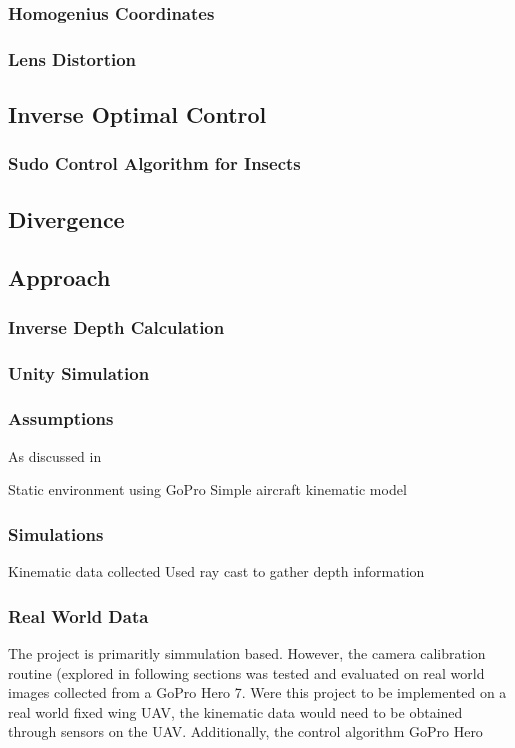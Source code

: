 \documentclass{UoNMCHA}
\numberwithin{equation}{section}
\begin{document}
\subsubsection{Homogenius Coordinates}

\subsubsection{Lens Distortion}

\subsection{Inverse Optimal Control} %
\subsubsection{Sudo Control Algorithm for Insects}
\subsubsection{}
\subsection{Divergence}
 
\subsection{Approach}
\subsubsection{Inverse Depth Calculation}
\subsubsection{Unity Simulation}
\subsubsection{Assumptions}
As discussed in 

Static environment
using GoPro
Simple aircraft kinematic model
\subsubsection{Simulations}
Kinematic data collected
Used ray cast to gather depth information
\subsubsection{Real World Data}
The project is primaritly simmulation based. However, the camera calibration routine (explored in following sections was tested and evaluated on real world images collected from a GoPro Hero 7. Were this project to be implemented on a real world fixed wing UAV, the kinematic data would need to be obtained through sensors on the UAV. Additionally, the control algorithm
GoPro Hero
\newpage
\end{document}
